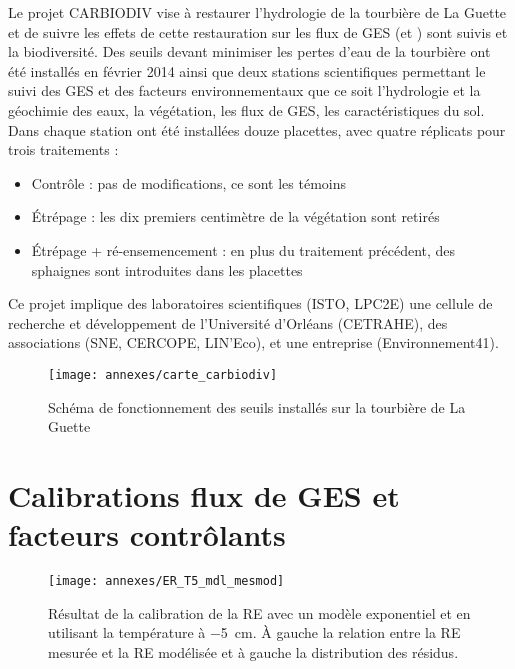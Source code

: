Le projet CARBIODIV vise à restaurer l'hydrologie de la tourbière de La Guette et de suivre les effets de cette restauration sur les flux de GES (\coo et \chh) sont suivis et la biodiversité.
Des seuils devant minimiser les pertes d'eau de la tourbière ont été installés en février 2014 ainsi que deux stations scientifiques permettant le suivi des GES et des facteurs environnementaux que ce soit l'hydrologie et la géochimie des eaux, la végétation, les flux de GES, les caractéristiques du sol.
Dans chaque station ont été installées douze placettes, avec quatre réplicats pour trois traitements :
\begin{itemize}
\item Contrôle : pas de modifications, ce sont les témoins
\item Étrépage : les dix premiers centimètre de la végétation sont retirés
\item Étrépage + ré-ensemencement : en plus du traitement précédent, des sphaignes sont introduites dans les placettes
\end{itemize}
Ce projet implique des laboratoires scientifiques (ISTO, LPC2E) une cellule de recherche et développement de l'Université d'Orléans (CETRAHE), des associations (SNE, CERCOPE, LIN'Eco), et une entreprise (Environnement41).


\begin{figure}[!hbt]
\centering
\texttt{[image: annexes/carte\_carbiodiv]}\\
\caption{Schéma de fonctionnement des seuils installés sur la tourbière de La Guette}
\label{fig:carte_carbiodiv}
\end{figure}





\clearpage
\section{Calibrations flux de GES et facteurs contrôlants}
\label{sec:calib_flux}

\begin{figure}[!hbt]
\centering
\texttt{[image: annexes/ER\_T5\_mdl\_mesmod]}\\
\caption{Résultat de la calibration de la RE avec un modèle exponentiel et en utilisant la température à \SI{-5}{\centi\metre}. À gauche la relation entre la RE mesurée et la RE modélisée et à gauche la distribution des résidus.}
\label{fig:RE_T5}
\end{figure}




